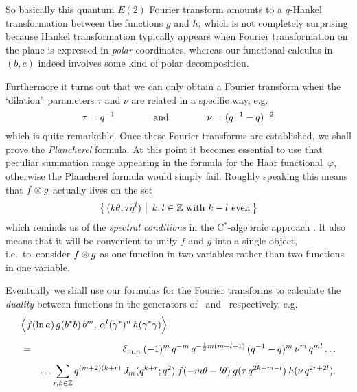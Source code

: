 So basically this quantum $E(2)$ Fourier transform amounts to a $q$-Hankel transformation
between the functions $g$ and $h$, which is not completely surprising because
Hankel transformation typically appears when Fourier transformation on the plane
is expressed in {\em polar\/} coordinates, whereas our functional calculus in
$(b,c)$ indeed involves some kind of polar decomposition.

Furthermore it turns out that we can only obtain a Fourier transform when the
\lq dilation\rq\ parameters $\tau$ and $\nu$ are related in a specific way, e.g.
$$   \tau = q^{-1}   \andspace{4em}   \nu = (q^{-1}-q)^{-2} $$
which is quite remarkable.
Once these Fourier transforms are established, we shall prove the {\em Plancherel\/} formula.
At this point it becomes essential to use that peculiar summation
range appearing in the formula for the Haar \mbox{functional $\varphi$},
otherwise the Plancherel formula would simply fail.
Roughly speaking this means that $f\tens g$ actually lives on the set
$$ \left\{ \, (k \theta, \tau q^l)   \, \left|\vertM\right. \,
            k,l\in \ZZ \mbox{ with } k-l \mbox{ even} \, \right\}  $$
which reminds us of the {\em spectral conditions\/} in the \mbox{C$^*$}-algebraic
approach \cite{Wor:QE2}\@.
It also means that it will be convenient to unify $f$ and $g$ into a single object,
\mbox{i.e.\ to}\ consider $f\tens g$ as one function in two variables rather than two functions
in one variable.
\vspace{1ex}

Eventually we shall use our formulas for the Fourier transforms to calculate the
{\em duality\/} between functions in the generators of \Uq\ and \Aq\ respectively, e.g.
\begin{eqnarray*}
      \lefteqn{\pairM{\vertL f(\ln a)\, g(b^* b)\, b^m}{\alpha^l (\gamma^*)^n \,h(\gamma^*\gamma)}}
\\
&\vertXL=&
      \delta_{m,n} \: (-1)^m \, q^{-m}\, q^{-\frac{1}{2}m(m+l+1)}\,
                      (q^{-1}-q)^m \,  \nu^m \, q^{ml} \ldots
\\
&\vertXL&
      \ldots  \sum_{r,k\in \ZZ}   q^{(m+2)(k+r)} \, \J{m}{q^{k+r}} \:
              f(-m\theta-l\theta) \: g(\tau\, q^{2k-m-l})  \: h(\nu\, q^{2r+2l}).
\end{eqnarray*}
